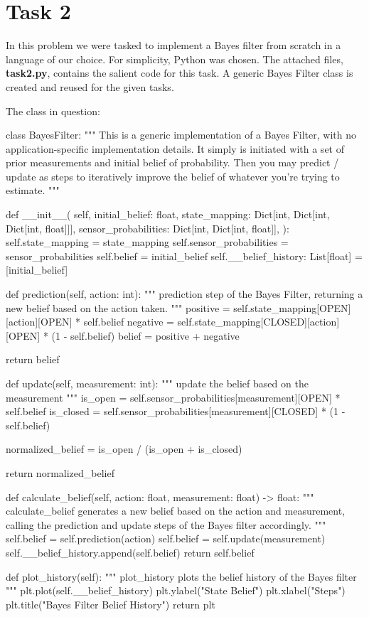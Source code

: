 \documentclass{article}
\begin{document}
\section*{Task 2}

In this problem we were tasked to implement a Bayes filter from scratch in a language of our choice. For simplicity, Python was chosen. The attached files, \textbf{task2.py}, contains the salient code for this task. A generic Bayes Filter class is created and reused for the given tasks.

The class in question:

\begin{python}
    class BayesFilter:
    """
    This is a generic implementation of a Bayes Filter, with no
    application-specific implementation details. It simply is
    initiated with a set of prior measurements and initial belief
    of probability. Then you may predict / update as steps to
    iteratively improve the belief of whatever you're trying to
    estimate.
    """

    def __init__(
    self,
    initial_belief: float,
    state_mapping: Dict[int, Dict[int, Dict[int, float]]],
    sensor_probabilities: Dict[int, Dict[int, float]],
    ):
    self.state_mapping = state_mapping
    self.sensor_probabilities = sensor_probabilities
    self.belief = initial_belief
    self.__belief_history: List[float] = [initial_belief]

    def prediction(self, action: int):
    """
    prediction step of the Bayes Filter, returning a new belief
    based on the action taken.
    """
    positive = self.state_mapping[OPEN][action][OPEN] * self.belief
    negative = self.state_mapping[CLOSED][action][OPEN] * (1 - self.belief)
    belief = positive + negative

    return belief

    def update(self, measurement: int):
    """
    update the belief based on the measurement
    """
    is_open = self.sensor_probabilities[measurement][OPEN] * self.belief
    is_closed = self.sensor_probabilities[measurement][CLOSED] * (1 - self.belief)

    normalized_belief = is_open / (is_open + is_closed)

    return normalized_belief

    def calculate_belief(self, action: float, measurement: float) -> float:
    """
    calculate_belief generates a new belief based on the action
    and measurement, calling the prediction and update steps of
    the Bayes filter accordingly.
    """
    self.belief = self.prediction(action)
    self.belief = self.update(measurement)
    self.__belief_history.append(self.belief)
    return self.belief

    def plot_history(self):
    """
    plot_history plots the belief history of the Bayes filter
    """
    plt.plot(self.__belief_history)
    plt.ylabel("State Belief")
    plt.xlabel("Steps")
    plt.title("Bayes Filter Belief History")
    return plt
\end{python}
\end{document}
